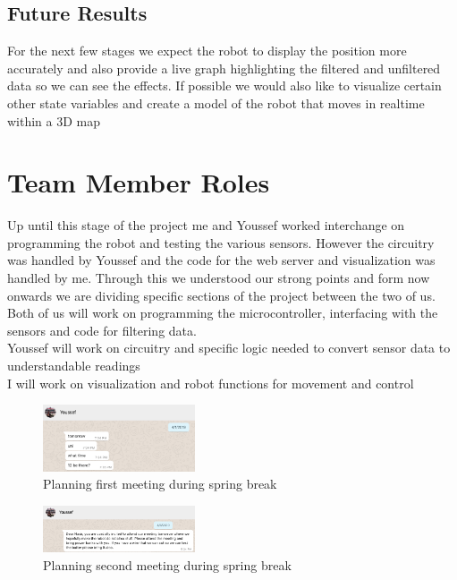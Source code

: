 \documentclass[conference]{IEEEtran}
\begin{document}
    \subsection{Future Results}

    For the next few stages we expect the robot to display the position more accurately and also
    provide a live graph highlighting the filtered and unfiltered data so we can see the effects.
    If possible we would also like to visualize certain other state variables and create a model
    of the robot that moves in realtime within a 3D map
    
    \section{Team Member Roles}

    Up until this stage of the project me and Youssef worked interchange on programming the robot
    and testing the various sensors. However the circuitry was handled by Youssef and the code for
    the web server and visualization was handled by me. Through this we understood our strong points
    and form now onwards we are dividing specific sections of the project between the two of us.\\

    Both of us will work on programming the microcontroller, interfacing with the sensors and code
    for filtering data.\\

    Youssef will work on circuitry and specific logic needed to convert sensor data to understandable
    readings\\

    I will work on visualization and robot functions for movement and control

    \begin{figure}[H]
        \centering
        \captionsetup{justification=centering}
        \centering
        \includegraphics[width=0.4\textwidth]{m1.png}
        \caption{Planning first meeting during spring break}
    \end{figure}

    \begin{figure}[H]
        \centering
        \captionsetup{justification=centering}
        \centering
        \includegraphics[width=0.4\textwidth]{m2.png}
        \caption{Planning second meeting during spring break}
    \end{figure}
\end{document}
